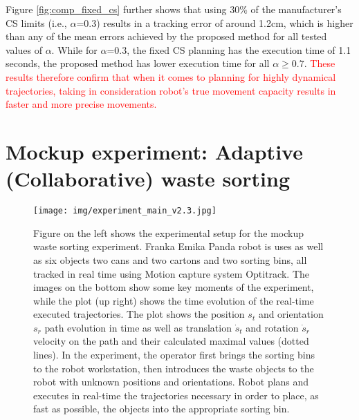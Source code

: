 Figure \ref{fig:comp_fixed_cs} further shows that using 30\% of the manufacturer's CS limits (i.e., $\alpha$=0.3) results in a tracking error of around 1.2cm, which is higher than any of the mean errors achieved by the proposed method for all tested values of $\alpha$.
While for $\alpha$=0.3, the fixed CS planning has the execution time of 1.1 seconds, the proposed method has lower execution time for all $\alpha\geq0.7$. 
\textcolor{red}{These results therefore confirm that when it comes to planning for highly dynamical trajectories, taking in consideration robot's true movement capacity results in faster and more precise movements. }







\section{Mockup experiment: Adaptive (Collaborative) waste sorting}
\label{ch:experiment_mockup}
\begin{figure*}[!t]
    \centering
    \texttt{[image: img/experiment\_main\_v2.3.jpg]}   
    \caption{Figure on the left shows the experimental setup for the mockup waste sorting experiment. Franka Emika Panda robot is uses as well as six objects two cans and two cartons and two sorting bins, all tracked in real time using Motion capture system Optitrack. The images on the bottom show some key moments of the experiment, while the plot (up right) shows the time evolution of the real-time executed trajectories. The plot shows the position $s_t$ and orientation $s_r$ path evolution in time as well as translation $\dot{s}_t$ and rotation $\dot{s}_r$ velocity on the path and their calculated maximal values (dotted lines).  In the experiment, the operator first brings the sorting bins to the robot workstation, then introduces the waste objects to the robot with unknown positions and orientations. Robot plans and executes in real-time the trajectories necessary in order to place, as fast as possible, the objects into the appropriate sorting bin.}
    \label{fig:setup}
\end{figure*}

